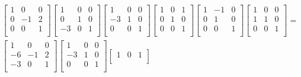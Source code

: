 \documentclass[12pt]{article}
\begin{document}
\begin{enumerate}
\begin{align*}
      \begin{bmatrix}
        1 &  0 & 0\\
        0 & -1 & 2\\
        0 &  0 & 1\\
      \end{bmatrix}
      \begin{bmatrix}
         1 &  0 & 0\\
         0 &  1 & 0\\
        -3 &  0 & 1\\
      \end{bmatrix}
      \begin{bmatrix}
         1 &  0 & 0\\
        -3 &  1 & 0\\
         0 &  0 & 1\\
      \end{bmatrix}
      \begin{bmatrix}
        1 &  0 & 1\\
        0 &  1 & 0\\
        0 &  0 & 1\\
      \end{bmatrix}
      \begin{bmatrix}
        1 & -1 & 0\\
        0 &  1 & 0\\
        0 &  0 & 1\\
      \end{bmatrix}
      \begin{bmatrix}
        1 &  0 & 0\\
        1 &  1 & 0\\
        0 &  0 & 1\\
      \end{bmatrix} =\\
      \begin{bmatrix}
         1 &  0 & 0\\
        -6 & -1 & 2\\
        -3 &  0 & 1\\
      \end{bmatrix}
      \begin{bmatrix}
         1 &  0 & 0\\
        -3 &  1 & 0\\
         0 &  0 & 1\\
      \end{bmatrix}
      \begin{bmatrix}
        1 &  0 & 1\\

\end{bmatrix}
\end{align*}
\end{enumerate}
\end{document}
